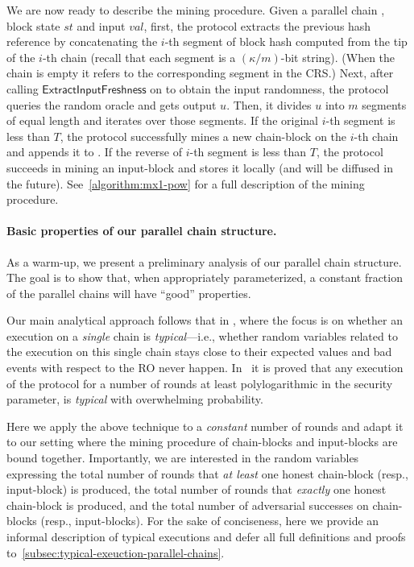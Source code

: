 We are now ready to describe the mining procedure.
%
Given a parallel chain \parallelChains, block state $st$ and input $val$, first, the protocol extracts the previous hash reference by concatenating the $i$-th segment of block hash computed from the tip of the $i$-th chain (recall that each segment is a $(\kappa / m)$-bit string).
%
(When the chain is empty it refers to the corresponding segment in the CRS.)
%
Next, after calling $\mathsf{ExtractInputFreshness}$ on \parallelChains to obtain the input randomness, the protocol queries the random oracle and gets output $u$.
%
Then, it divides $u$ into $m$ segments of equal length and iterates over those segments.
%
If the original $i$-th segment is less than $T$, the protocol successfully mines a new chain-block on the $i$-th chain and appends it to \parallelChains.
%
If the reverse of $i$-th segment is less than $T$, the protocol succeeds in mining an input-block and stores it locally (and will be diffused in the future).
%
See~\cref{algorithm:mx1-pow} for a full description of the mining procedure.



\paragraph{Basic properties of our parallel chain structure.}
%
As a warm-up, we present a preliminary analysis of our parallel chain structure.
%
The goal is to show that, when appropriately parameterized, a constant fraction of the parallel chains will have ``good'' properties.

Our main analytical approach follows that in \cite{EPRINT:GarKiaLeo14,C:GarKiaLeo17}, where the focus is on whether an execution on a \emph{single} chain is \emph{typical}---i.e., whether random variables related to the execution on this single chain stays close to their expected values and bad events with respect to the RO never happen.
%
In~\cite{EPRINT:GarKiaLeo14} it is proved that any execution of the protocol for a number of rounds at least polylogarithmic in the security parameter, is \emph{typical} with overwhelming probability.

Here we apply the above technique to a \emph{constant} number of rounds and adapt it to our setting where the mining procedure of chain-blocks and input-blocks are bound together.
%
Importantly, we are interested in the random variables expressing the total number of rounds that \emph{at least} one honest chain-block (resp., input-block) is produced, the total number of rounds that \emph{exactly} one honest chain-block is produced, and the total number of adversarial successes on chain-blocks (resp., input-blocks).
%
For the sake of conciseness, here we provide an informal description of typical executions and defer all full definitions and proofs to~\cref{subsec:typical-exeuction-parallel-chains}.


